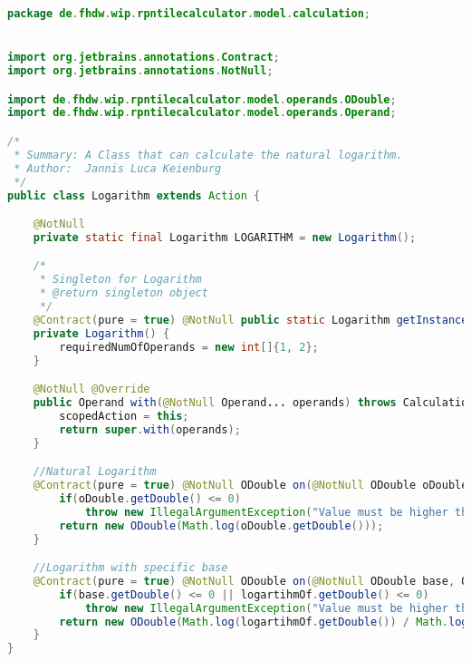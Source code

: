 \begin{lstlisting}[caption=Logarithm (Keienburg),label=list:Logarithm,language=Java]
package de.fhdw.wip.rpntilecalculator.model.calculation;


import org.jetbrains.annotations.Contract;
import org.jetbrains.annotations.NotNull;

import de.fhdw.wip.rpntilecalculator.model.operands.ODouble;
import de.fhdw.wip.rpntilecalculator.model.operands.Operand;

/*
 * Summary: A Class that can calculate the natural logarithm.
 * Author:  Jannis Luca Keienburg
 */
public class Logarithm extends Action {

    @NotNull
    private static final Logarithm LOGARITHM = new Logarithm();

    /*
     * Singleton for Logarithm
     * @return singleton object
     */
    @Contract(pure = true) @NotNull public static Logarithm getInstance() { return LOGARITHM; }
    private Logarithm() {
        requiredNumOfOperands = new int[]{1, 2};
    }

    @NotNull @Override
    public Operand with(@NotNull Operand... operands) throws CalculationException {
        scopedAction = this;
        return super.with(operands);
    }

    //Natural Logarithm
    @Contract(pure = true) @NotNull ODouble on(@NotNull ODouble oDouble) {
        if(oDouble.getDouble() <= 0)
            throw new IllegalArgumentException("Value must be higher than Zero.");
        return new ODouble(Math.log(oDouble.getDouble()));
    }

    //Logarithm with specific base
    @Contract(pure = true) @NotNull ODouble on(@NotNull ODouble base, ODouble logartihmOf) {
        if(base.getDouble() <= 0 || logartihmOf.getDouble() <= 0)
            throw new IllegalArgumentException("Value must be higher than Zero.");
        return new ODouble(Math.log(logartihmOf.getDouble()) / Math.log(base.getDouble()));
    }
}
\end{lstlisting}    

